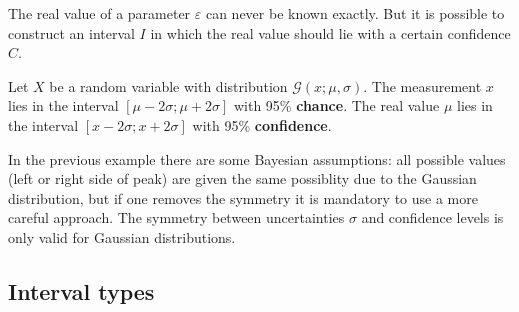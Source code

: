 {    The real value of a parameter $\varepsilon$ can never be known exactly. But it is possible to construct an interval $I$ in which the real value should lie with a certain confidence $C$.
    \begin{example}
        Let $X$ be a random variable with distribution $\mathcal{G}(x;\mu, \sigma)$. The measurement $x$ lies in the interval $[\mu - 2\sigma;\mu+2\sigma]$ with 95\% \textbf{chance}. The real value $\mu$ lies in the interval $[x - 2\sigma;x+2\sigma]$ with 95\% \textbf{confidence}.
    \end{example}
    \begin{remark*}
        In the previous example there are some Bayesian assumptions: all possible values (left or right side of peak) are given the same possiblity due to the Gaussian distribution, but if one removes the symmetry it is mandatory to use a more careful approach. The symmetry between uncertainties $\sigma$ and confidence levels is only valid for Gaussian distributions.
    \end{remark*}

\subsection{Interval types}



}
